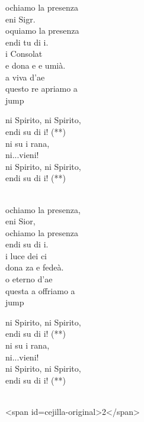 \begin{cancion}%
	ochiamo la  presenza \\
	eni Sigr.\\
	oquiamo la  presenza\\
	endi tu di i.\\
	i Consolat\\
	e dona e e umià.\\
	a viva d'ae\\
	questo re apriamo a  \\jump\\
	\begin{chorus}%
	ni Spirito, ni Spirito,\\
	endi su di i! (**)\\
	ni su i rana, \\
	ni...vieni!\\
	ni Spirito, ni Spirito,\\
	endi su di i! (**)\\
	\end{chorus}%
	\jump\\
	ochiamo la  presenza,\\
	eni Sior,\\
	ochiamo la  presenza\\
	endi su di i.\\
	i luce dei ci\\
	dona za e fedeà.\\
	o eterno d'ae\\
	questa a offriamo a  \\jump\\
	\begin{chorus}%
	ni Spirito, ni Spirito,\\
	endi su di i! (**)\\
	ni su i rana, \\
	ni...vieni!\\
	ni Spirito, ni Spirito,\\
	endi su di i! (**)\\
	\end{chorus}%
	\jump\\
<span id=cejilla-original>2</span>\\
\end{cancion}%
